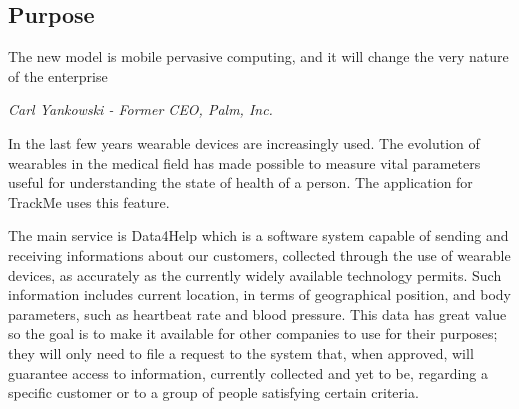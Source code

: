 \documentclass[../main.tex]{subfiles}
\begin{document}
\subsection{Purpose}

\epigraph{The new model is mobile pervasive computing, and it will change the very nature of the enterprise}{\textit{Carl Yankowski - Former CEO, Palm, Inc.}}





In the last few years wearable devices are increasingly used. The evolution of wearables in the medical field has made possible to measure vital parameters useful for understanding the state of health of a person. The application for TrackMe uses this feature.

The main service is Data4Help which is a software system capable of sending and receiving informations about our customers, collected through the use of wearable devices, as accurately as the currently widely available technology permits. Such information includes current location, in terms of geographical position, and body parameters, such as heartbeat rate and blood pressure. 
This data has great value so the goal is to make it available for other companies to use for their purposes; they will only need to file a request to the system that, when approved, will guarantee access to information, currently collected and yet to be, regarding a specific customer or to a group of people satisfying certain criteria. 
\end{document}
